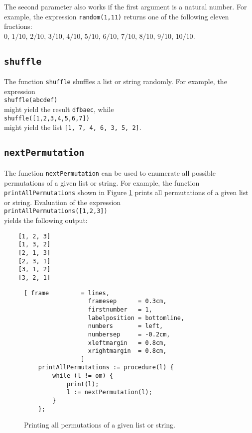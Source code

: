 \begin{enumerate}
      The second parameter also works if the first argument is a natural number.  For example, the
      expression \texttt{random(1,11)} returns one of the following eleven fractions:
      \\[0.2cm]
      \hspace*{1.3cm}
      $0$, $1/10$, $2/10$, $3/10$, $4/10$, $5/10$,
      $6/10$, $7/10$, $8/10$, $9/10$, $10/10$.      
\end{enumerate}

\subsection{\texttt{shuffle}}
The function \texttt{shuffle} shuffles a list or string
randomly.  For example, the expression
\\[0.2cm]
\hspace*{1.3cm}
\texttt{shuffle(abcdef)}
\\[0.2cm]
might yield the result \texttt{dfbaec}, while 
\\[0.2cm]
\hspace*{1.3cm}
\texttt{shuffle([1,2,3,4,5,6,7])}
\\[0.2cm]
might yield the list \texttt{[1, 7, 4, 6, 3, 5, 2]}.

\subsection{\texttt{nextPermutation}}
The function \texttt{nextPermutation} can be used to enumerate all possible permutations
of a given list or string.  For example, the function \texttt{printAllPermutations} shown
in Figure \ref{fig:allPermutations.stlx} prints all permutations of a given list or string.
Evaluation of the expression
\\[0.2cm]
\hspace*{1.3cm}
\texttt{printAllPermutations([1,2,3])}
\\[0.2cm]
yields the following output:
\begin{verbatim}
    [1, 2, 3]
    [1, 3, 2]
    [2, 1, 3]
    [2, 3, 1]
    [3, 1, 2]
    [3, 2, 1]
\end{verbatim}

\begin{figure}[!ht]
\centering
\begin{Verbatim}[ frame         = lines, 
                  framesep      = 0.3cm, 
                  firstnumber   = 1,
                  labelposition = bottomline,
                  numbers       = left,
                  numbersep     = -0.2cm,
                  xleftmargin   = 0.8cm,
                  xrightmargin  = 0.8cm,
                ]
    printAllPermutations := procedure(l) {
        while (l != om) {
            print(l);
            l := nextPermutation(l);        
        }
    };
\end{Verbatim}
\vspace*{-0.3cm}
\caption{Printing all permutations of a given list or string.}
\label{fig:allPermutations.stlx}
\end{figure}

